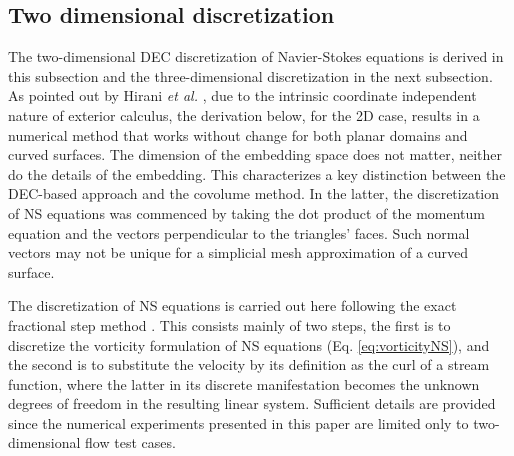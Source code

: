 \documentclass[final,12pt,times]{elsarticle}
\begin{document}
\subsection{Two dimensional discretization}
\label{subsec:discretization:2D}

The two-dimensional DEC discretization of Navier-Stokes equations is derived in this subsection and the three-dimensional discretization in the next subsection. As pointed out by Hirani \textit{et al.} \cite{HiNaCh2015}, due to the intrinsic coordinate independent nature of exterior calculus, the derivation below, for the 2D case, results in a numerical method that works without change for both planar domains and curved surfaces. The dimension of the embedding space does not matter, neither do the details of the embedding. This characterizes a key distinction between the DEC-based approach and the covolume method. In the latter, the discretization of NS equations was commenced by taking the dot product of the momentum equation and the vectors perpendicular to the triangles' faces. Such normal vectors may not be unique for a simplicial mesh approximation of a curved surface.  

The discretization of NS equations is carried out here following the exact fractional step method \cite{HallCavendish:1991dvmsvf,chang2002analysis}. This consists mainly of two steps, the first is to discretize the vorticity formulation of NS equations (Eq. \eqref{eq:vorticityNS}), and the second is to substitute the velocity by its definition as the curl of a stream function, where the latter in its discrete manifestation becomes the unknown degrees of freedom in the resulting linear system. Sufficient details are provided  since the numerical experiments presented in this paper are limited only to two-dimensional flow test cases.  
\end{document}
